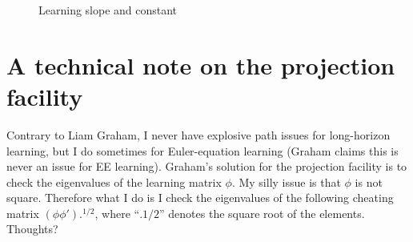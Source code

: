\documentclass[11pt]{article}
\def \myFigPath {../figures/}
\renewcommand{\[}{\begin{equation}}
\renewcommand{\]}{\end{equation}}
\def\mySmallerFigScale{0.18}
\begin{document}
\begin{figure}[h!]
\caption{Learning slope and constant}
\end{figure}


\section{A technical note on the projection facility}
Contrary to Liam Graham, I never have explosive path issues for long-horizon learning, but I do sometimes for Euler-equation learning (Graham claims this is never an issue for EE learning). Graham's solution for the projection facility is to check the eigenvalues of the learning matrix $\phi$. My silly issue is that $\phi$ is not square. Therefore what I do is I check the eigenvalues of the following cheating matrix $(\phi\phi').^{1/2}$, where ``$.{1/2}$'' denotes the square root of the elements. Thoughts?
\end{document}

